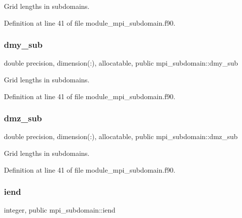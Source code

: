Grid lengths in subdomains. 



Definition at line 41 of file module\+\_\+mpi\+\_\+subdomain.\+f90.

\mbox{\label{namespacempi__subdomain_ae44efbff9669bfad03a79ab41b5e8ace}} 
\subsubsection{\texorpdfstring{dmy\_sub}{dmy\_sub}}
{\footnotesize\ttfamily double precision, dimension(\+:), allocatable, public mpi\+\_\+subdomain\+::dmy\+\_\+sub}



Grid lengths in subdomains. 



Definition at line 41 of file module\+\_\+mpi\+\_\+subdomain.\+f90.

\mbox{\label{namespacempi__subdomain_afb6341d7362587d6fd0a06fe78ba4e3f}} 
\subsubsection{\texorpdfstring{dmz\_sub}{dmz\_sub}}
{\footnotesize\ttfamily double precision, dimension(\+:), allocatable, public mpi\+\_\+subdomain\+::dmz\+\_\+sub}



Grid lengths in subdomains. 



Definition at line 41 of file module\+\_\+mpi\+\_\+subdomain.\+f90.

\mbox{\label{namespacempi__subdomain_abbd7d35107c53bcfd2b2b52771f4aa67}} 
\subsubsection{\texorpdfstring{iend}{iend}}
{\footnotesize\ttfamily integer, public mpi\+\_\+subdomain\+::iend}



